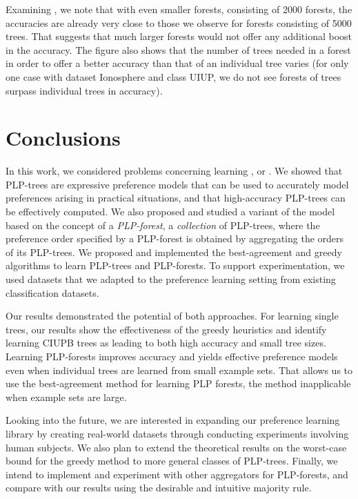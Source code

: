 Examining , we note that with even smaller forests, consisting
of 2000 forests, the accuracies are already very close to those we observe 
for forests consisting of 5000 trees. That suggests that much larger forests
would not offer any additional boost in the accuracy.
The figure also shows that the number of trees needed in a forest in order to
offer a better accuracy than that of an individual tree varies (for only 
one case with dataset Ionosphere and class UIUP, we do not see forests 
of trees surpass individual trees in accuracy).

\section{Conclusions}
In this work, we considered problems concerning learning
, or .
We showed that PLP-trees are expressive preference models that can be
used to accurately model preferences arising in practical situations, and
that high-accuracy PLP-trees can be effectively computed. We also proposed
and studied a variant of the model based on the concept of a \emph{PLP-forest},
a \emph{collection} of PLP-trees, where the preference order specified by a
PLP-forest is obtained by aggregating the orders of its PLP-trees.
We proposed and implemented the best-agreement and greedy algorithms
to learn PLP-trees and PLP-forests. To support experimentation, we used
datasets that we adapted to the preference learning setting from existing
classification datasets.

Our results demonstrated the potential of both approaches. For learning 
single trees, our results show the effectiveness of the greedy heuristics 
and identify learning CIUPB trees as leading to both high accuracy and small
tree sizes. Learning PLP-forests improves accuracy and yields effective
preference models even when individual trees are learned from small example
sets. That allows us to use the best-agreement method for learning
PLP forests, the method inapplicable when example sets are large.

Looking into the future, we are interested in expanding our preference
learning library by creating real-world datasets through
conducting experiments involving human subjects.
We also plan to extend the theoretical results on the worst-case
bound for the greedy method to more general classes of PLP-trees.
Finally, we intend to implement and experiment with other aggregators
for PLP-forests, and compare with our results using
the desirable and intuitive majority rule.

